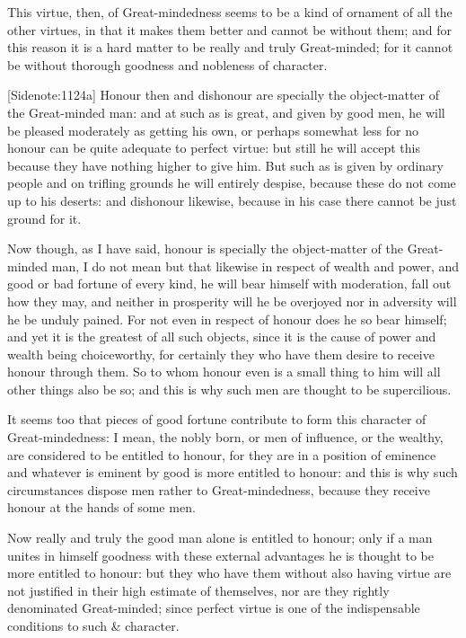 This virtue, then, of Great-mindedness seems to be a kind of ornament
of all the other virtues, in that it makes them better and cannot be
without them; and for this reason it is a hard matter to be really and
truly Great-minded; for it cannot be without thorough goodness and
nobleness of character.

[Sidenote:1124a] Honour then and dishonour are specially the
object-matter of the Great-minded man: and at such as is great, and
given by good men, he will be pleased moderately as getting his own, or
perhaps somewhat less for no honour can be quite adequate to perfect
virtue: but still he will accept this because they have nothing higher
to give him. But such as is given by ordinary people and on trifling
grounds he will entirely despise, because these do not come up to his
deserts: and dishonour likewise, because in his case there cannot be
just ground for it.

Now though, as I have said, honour is specially the object-matter of the
Great-minded man, I do not mean but that likewise in respect of wealth
and power, and good or bad fortune of every kind, he will bear himself
with moderation, fall out how they may, and neither in prosperity will
he be overjoyed nor in adversity will he be unduly pained. For not even
in respect of honour does he so bear himself; and yet it is the greatest
of all such objects, since it is the cause of power and wealth being
choiceworthy, for certainly they who have them desire to receive honour
through them. So to whom honour even is a small thing to him will all
other things also be so; and this is why such men are thought to be
supercilious.

It seems too that pieces of good fortune contribute to form this
character of Great-mindedness: I mean, the nobly born, or men of
influence, or the wealthy, are considered to be entitled to honour, for
they are in a position of eminence and whatever is eminent by good is
more entitled to honour: and this is why such circumstances dispose men
rather to Great-mindedness, because they receive honour at the hands of
some men.

Now really and truly the good man alone is entitled to honour; only if
a man unites in himself goodness with these external advantages he is
thought to be more entitled to honour: but they who have them without
also having virtue are not justified in their high estimate of
themselves, nor are they rightly denominated Great-minded; since perfect
virtue is one of the indispensable conditions to such & character.

